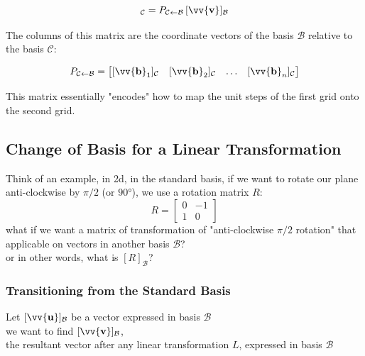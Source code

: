 \documentclass[11pt]{article}
\DeclareRobustCommand{\myvec}[1]{\vv{\mathbf{#1}}}
\newcommand{\myset}[1]{\mathcal{#1}}
\newcommand{\mymat}[1]{#1}
\begin{document}
    \begin{equation}
        [\myvec{v}]_{\myset{C}} = \mymat{P}_{\myset{C} \leftarrow \myset{B}}\,[\myvec{v}]_{\myset{B}}
    \end{equation}

    The columns of this matrix are the coordinate vectors of the basis $\myset{B}$ relative to the basis $\myset{C}$:

    \begin{equation}
        \mymat{P}_{\myset{C} \leftarrow \myset{B}} = 
        \begin{bmatrix} 
            [\myvec{b}_1]_{\myset{C}} & [\myvec{b}_2]_{\myset{C}} & \dots & [\myvec{b}_n]_{\myset{C}} 
        \end{bmatrix}
    \end{equation}

    This matrix essentially "encodes" how to map the unit steps of the first grid onto the second grid.


    \newpage
    \subsection{Change of Basis for a Linear Transformation}
    
    Think of an example, in 2d, in the standard basis, if we want to rotate our plane anti-clockwise by $\pi/2$ (or $\ang{90}$), we use a rotation matrix $\mymat{R}$:
    \[ \mymat{R} = \begin{bmatrix}
        0 & -1 \\
        1 & 0
    \end{bmatrix} \]
    what if we want a matrix of transformation of "anti-clockwise $\pi/2$ rotation" that applicable on vectors in another basis $\myset{B}$?\\
    or in other words, what is $[\mymat{R}]_\myset{B}$? \vspace{\belowdisplayskip}

    \subsubsection{Transitioning from the Standard Basis}

    Let $[\myvec{u}]_{\myset{B}}$ be a vector expressed in basis $\myset{B}$\\
    we want to find $[\myvec{v}]_{\myset{B}}$, \\
    \quad the resultant vector after any linear transformation $\mymat{L}$, expressed in basis $\myset{B}$ \vspace{\belowdisplayshortskip}
\end{document}

